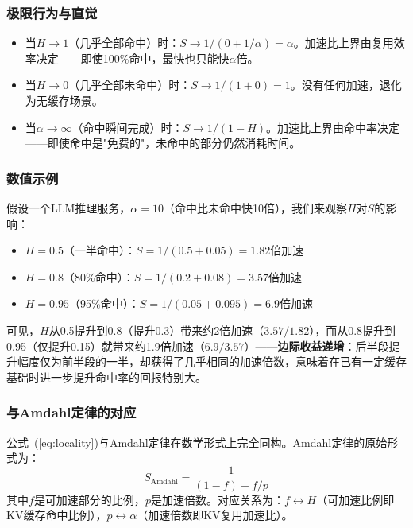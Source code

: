 \subsubsection{极限行为与直觉}

\begin{itemize}[nosep]
\item 当$H \to 1$（几乎全部命中）时：$S \to 1/(0 + 1/\alpha) = \alpha$。加速比上界由复用效率决定——即使100\%命中，最快也只能快$\alpha$倍。
\item 当$H \to 0$（几乎全部未命中）时：$S \to 1/(1 + 0) = 1$。没有任何加速，退化为无缓存场景。
\item 当$\alpha \to \infty$（命中瞬间完成）时：$S \to 1/(1-H)$。加速比上界由命中率决定——即使命中是"免费的"，未命中的部分仍然消耗时间。
\end{itemize}

\subsubsection{数值示例}

假设一个LLM推理服务，$\alpha = 10$（命中比未命中快10倍），我们来观察$H$对$S$的影响：

\begin{itemize}[nosep]
\item $H = 0.5$（一半命中）：$S = 1/(0.5 + 0.05) = 1.82$倍加速
\item $H = 0.8$（80\%命中）：$S = 1/(0.2 + 0.08) = 3.57$倍加速
\item $H = 0.95$（95\%命中）：$S = 1/(0.05 + 0.095) = 6.9$倍加速
\end{itemize}

可见，$H$从0.5提升到0.8（提升0.3）带来约2倍加速（$3.57/1.82$），而从0.8提升到0.95（仅提升0.15）就带来约1.9倍加速（$6.9/3.57$）——\textbf{边际收益递增}：后半段提升幅度仅为前半段的一半，却获得了几乎相同的加速倍数，意味着在已有一定缓存基础时进一步提升命中率的回报特别大。

\subsubsection{与Amdahl定律的对应}

公式~(\ref{eq:locality})与Amdahl定律在数学形式上完全同构。Amdahl定律的原始形式为：
\begin{equation}
S_{\mathrm{Amdahl}} = \frac{1}{(1-f) + f/p}
\end{equation}
其中$f$是可加速部分的比例，$p$是加速倍数。对应关系为：$f \leftrightarrow H$（可加速比例即KV缓存命中比例），$p \leftrightarrow \alpha$（加速倍数即KV复用加速比）。

